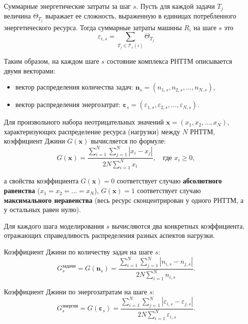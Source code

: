 Суммарные энергетические затраты за шаг $s$. Пусть для каждой задачи $T_j$ величина $\Theta_{T_j}$ выражает ее сложность, выраженную в единицах потребленного энергетического ресурса. Тогда суммарные затраты машины $R_i$ на шаге $s$ это
\begin{equation}
	\varepsilon_{i,s} = \sum_{T_j \in \mathcal{T}_s(i)} \Theta_{T_j}
\end{equation}

Таким образом, на каждом шаге $s$ состояние комплекса РНТТМ описывается двумя векторами:
\begin{itemize}[beginpenalty=10000, midpenalty=10000, wide=\parindent, leftmargin=0pt]
	\item вектор распределения количества задач: $\mathbf{n}_s = (n_{1,s}, n_{2,s}, \dots, n_{N,s})$,
	\item вектор распределения энергозатрат: $\boldsymbol{\varepsilon}_s = (\varepsilon_{1,s}, \varepsilon_{2,s}, \dots, \varepsilon_{N,s})$.
\end{itemize}

Для произвольного набора неотрицательных значений $\mathbf{x} = (x_1, x_2, \dots, x_N)$, характеризующих распределение ресурса (нагрузки) между $N$ РНТТМ, коэффициент Джини $G(\mathbf{x})$ вычисляется по формуле:
\begin{equation}
	\label{eq:gini_co}
	G(\mathbf{x}) = \frac{\displaystyle \sum_{i=1}^{N} \sum_{j=1}^{N} |x_i - x_j|}{\displaystyle 2 N \sum_{i=1}^{N} x_i}, \quad \text{где } x_i \ge 0,
\end{equation}

а свойства коэффициента $G(\mathbf{x}) = 0$ соответствует случаю \textbf{абсолютного равенства} ($x_1 = x_2 = \dots = x_N$), $G(\mathbf{x}) = 1$ соответствует случаю \textbf{максимального неравенства} (весь ресурс сконцентрирован у одного РНТТМ, а у остальных равен нулю).

Для каждого шага моделирования $s$ вычисляются два конкретных коэффициента, отражающих справедливость распределения разных аспектов нагрузки.

Коэффициент Джини по количеству задач на шаге $s$:
\begin{equation}
	G^{\text{задачи}}_s = G(\mathbf{n}_s) = \frac{\sum_{i=1}^{N} \sum_{j=1}^{N} |n_{i,s} - n_{j,s}|}{2 N \sum_{i=1}^{N} n_{i,s}}.
\end{equation}

Коэффициент Джини по энергозатратам на шаге $s$:
\begin{equation}
	G^{\text{энергия}}_s = G(\boldsymbol{\varepsilon}_s) = \frac{\sum_{i=1}^{N} \sum_{j=1}^{N} |\varepsilon_{i,s} - \varepsilon_{j,s}|}{2 N \sum_{i=1}^{N} \varepsilon_{i,s}}.
\end{equation}

